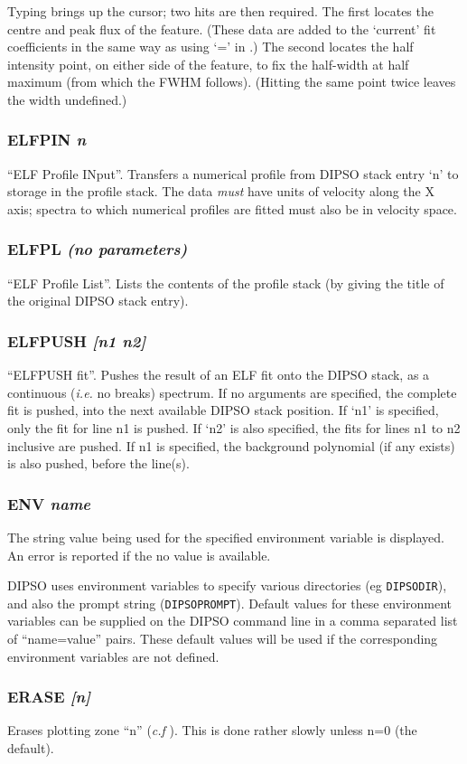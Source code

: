\documentclass[twoside,11pt,noabs,nolof]{starlink}
\providecommand{\dipcom}[3]{\subsubsection*{\label{COM:#1}\xlabel{COM:#1}\textbf{#1} \emph{#2}}}
\begin{document}
Typing   brings up the cursor; two hits are then required. The
first locates the centre and peak flux of the feature. (These data are
added to the `current' fit coefficients in the same way as using `='
in .)  The second locates the half intensity point, on either
side of the feature, to fix the half-width at half maximum (from which
the FWHM follows). (Hitting the same point twice leaves the width
undefined.)

\dipcom{ELFPIN}{n}{Moves data from the DIPSO stack to the ELF profile stack}
``ELF Profile INput''. Transfers a numerical profile from DIPSO stack
entry `n' to storage in the profile stack. The data \emph{must} have
units of velocity along the X axis; spectra to which numerical
profiles are fitted must also be in velocity space.

\dipcom{ELFPL}{(no parameters)}{Lists the contents of the ELF profile stack}
``ELF Profile List''. Lists the contents of the profile stack (by
giving the title of the original DIPSO stack entry).

\dipcom{ELFPUSH}{[n1 n2]}{Pushes a data array representing an ELF fit onto the DIPSO stack}
``ELFPUSH fit''. Pushes the result of an ELF fit onto the DIPSO
stack, as a continuous (\emph{i.e.} no breaks) spectrum. If no
arguments are specified, the complete fit is pushed, into the next
available DIPSO stack position. If `n1' is specified, only the fit for
line n1 is pushed. If `n2' is also specified, the fits for lines n1 to
n2 inclusive are pushed. If n1 is specified, the background polynomial
(if any exists) is also pushed, before the line(s).

\dipcom{ENV}{name}{Displays the value being used by DIPSO for a specified
environment variable}
The string value being used for the specified environment variable is
displayed. An error is reported if the no value is available.

DIPSO uses environment variables to specify various directories (eg
\verb+DIPSODIR+), and also the prompt string (\verb+DIPSOPROMPT+).
Default values for these environment variables can be supplied
on the DIPSO command line in a comma separated list of ``name=value''
pairs. These default values will be used if the corresponding environment
variables are not defined.

\dipcom{ERASE}{[n]}{Erases a plotting zone created by {\texttt{TZONE}}}
Erases plotting zone ``n'' (\textit{c.f} ).  This is done rather slowly
unless n=0 (the default).
\end{document}
